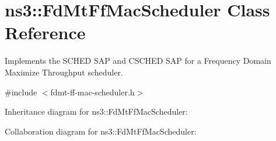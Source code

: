 \hypertarget{classns3_1_1FdMtFfMacScheduler}{}\section{ns3\+:\+:Fd\+Mt\+Ff\+Mac\+Scheduler Class Reference}
\label{classns3_1_1FdMtFfMacScheduler}


Implements the S\+C\+H\+ED S\+AP and C\+S\+C\+H\+ED S\+AP for a Frequency Domain Maximize Throughput scheduler.  




{\ttfamily \#include $<$fdmt-\/ff-\/mac-\/scheduler.\+h$>$}



Inheritance diagram for ns3\+:\+:Fd\+Mt\+Ff\+Mac\+Scheduler\+:


Collaboration diagram for ns3\+:\+:Fd\+Mt\+Ff\+Mac\+Scheduler\+:
